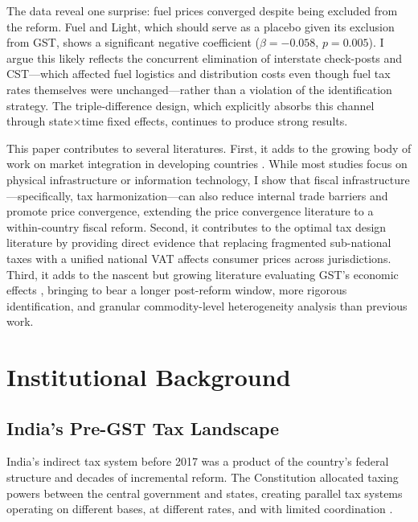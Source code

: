 \documentclass[12pt]{article}
\begin{document}
The data reveal one surprise: fuel prices converged despite being excluded from the reform. Fuel and Light, which should serve as a placebo given its exclusion from GST, shows a significant negative coefficient ($\beta = -0.058$, $p = 0.005$). I argue this likely reflects the concurrent elimination of interstate check-posts and CST---which affected fuel logistics and distribution costs even though fuel tax rates themselves were unchanged---rather than a violation of the identification strategy. The triple-difference design, which explicitly absorbs this channel through state$\times$time fixed effects, continues to produce strong results.

This paper contributes to several literatures. First, it adds to the growing body of work on market integration in developing countries \citep{donaldson2018railroads, jensen2007digital, aker2010information, barnwal2023market, vanleemput2021nation}. While most studies focus on physical infrastructure or information technology, I show that fiscal infrastructure---specifically, tax harmonization---can also reduce internal trade barriers and promote price convergence, extending the price convergence literature \citep{parsley1996convergence, engel1996intranational} to a within-country fiscal reform. Second, it contributes to the optimal tax design literature \citep{keen2013value, besley2014tax, emran2005institutions} by providing direct evidence that replacing fragmented sub-national taxes with a unified national VAT affects consumer prices across jurisdictions. Third, it adds to the nascent but growing literature evaluating GST's economic effects \citep{kumar2023gst}, bringing to bear a longer post-reform window, more rigorous identification, and granular commodity-level heterogeneity analysis than previous work.


\section{Institutional Background}\label{sec:background}

\subsection{India's Pre-GST Tax Landscape}

India's indirect tax system before 2017 was a product of the country's federal structure and decades of incremental reform. The Constitution allocated taxing powers between the central government and states, creating parallel tax systems operating on different bases, at different rates, and with limited coordination \citep{rao2009goods}.
\end{document}
